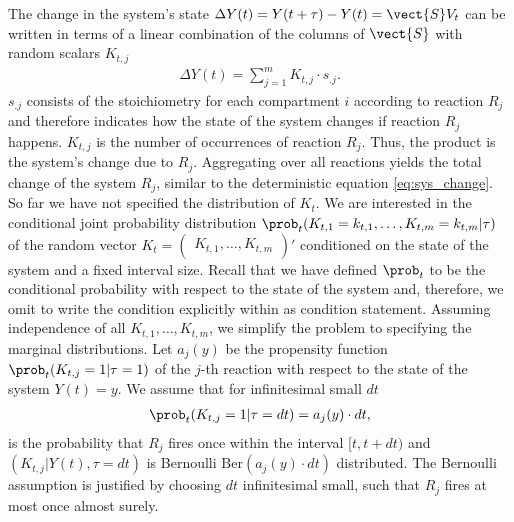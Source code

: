 The change in the system's state $\Delta Y(t) = Y(t + \tau) - Y(t)= \vect{S} V_t$ can be written in terms of a linear combination of the columns of $\vect{S}$ with random scalars $K_{t,j}$
\begin{align}
\Delta Y(t) = \sum_{j=1}^m K_{t,j} \cdot s_{.j}.
\end{align}
$s_{.j}$ consists of the stoichiometry for each compartment $i$ according to reaction $R_j$ and therefore indicates how the state of the system changes if reaction $R_j$ happens. $K_{t,j}$ is the number of occurrences of reaction $R_j$. Thus, the product is the system's change due to $R_j$. Aggregating over all reactions yields the total change of the system $R_j$, similar to the deterministic equation \eqref{eq:sys_change}.\\  

So far we have not specified the distribution of $K_t$. We are interested in the conditional joint probability distribution $\prob_t(K_{t,1} = k_{t,1}, \dots, K_{t,m} = k_{t,m}|\tau)$ of the random vector $K_t = \begin{pmatrix}
K_{t,1}, \dots, K_{t,m} \end{pmatrix}'$ conditioned on the state of the system and a fixed interval size. Recall that we have defined $\prob_t$ to be the conditional probability with respect to the state of the system and, therefore, we omit to write the condition explicitly within as condition statement. Assuming independence of all $K_{t, 1},\hdots, K_{t, m}$, we simplify the problem to specifying the marginal distributions. Let $a_j(y)$ be the propensity function $\prob_t(K_{t,j}=1|\tau=1)$ of the $j$-th reaction with respect to the state of the system $Y(t)=y$. We assume that for infinitesimal small $dt$
\begin{align}
\prob_t(K_{t,j} = 1|\tau = dt) = a_j(y) \cdot dt,
\end{align}
is the probability that $R_j$ fires once within the interval $[t, t+dt)$ and $\left(K_{t,j}|Y(t), \tau =dt \right)$ is Bernoulli $\mathrm{Ber}(a_j(y) \cdot dt)$ distributed. The Bernoulli assumption is justified by choosing $dt$ infinitesimal small, such that $R_j$ fires at most once almost surely.

